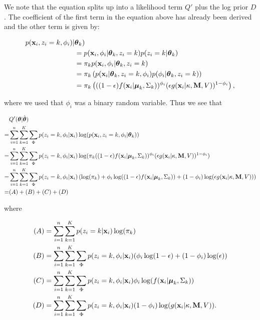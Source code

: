 \documentclass[12pt,english]{article}\usepackage[]{graphicx}\usepackage[]{color}
\begin{document}
We note that the equation splits up into a likelihood term $Q'$ plus
the log prior $D$. The coefficient of the first term in the equation
above has already been derived and the other term is given by:

\begin{equation}
\begin{split}
p({\bf x}_i, z_i = k , \phi_i)|&\boldsymbol{\theta}_k) \\
&=  p({\bf x}_i,\phi_i|\boldsymbol{\theta}_k,z_i=k)p(z_i=k|\boldsymbol{\theta}_k) \\
 & = \pi_k p({\bf x}_i,\phi_i|\boldsymbol{\theta}_k,z_i=k)\\
 & =\pi_k \left(p({\bf x}_i|\boldsymbol{\theta}_k,z_i=k, \phi_i)p(\phi_i|\boldsymbol{\theta}_k,z_i=k)\right)\\
 & = \pi_k \left(((1 - \epsilon)f({\bf x}_i|\boldsymbol{\mu}_k, \Sigma_k))^{\phi_i}(\epsilon g({\bf x}_i|\kappa, {\bf M}, V))^{1-\phi_i}\right),
\end{split}
\end{equation}

where we used that $\phi_i$ was a binary random variable. Thus we see that

\begin{equation}
\begin{split}
&Q'(\boldsymbol{\theta}| \hat{\boldsymbol{\theta}}) \\
 = & \sum_{i=1}^{n} \sum_{k=1}^{K}\sum_{\Phi}p(z_i = k, \phi_i|{\bf x}_i) \log(p({\bf x}_i, z_i = k , \phi_i|\boldsymbol{\theta}_k)) \\
= & \sum_{i=1}^{n} \sum_{k=1}^{K}\sum_{\Phi}p(z_i = k, \phi_i|{\bf x}_i) \log(\pi_k ((1 - \epsilon)f({\bf x}_i|\boldsymbol{\mu}_k, \Sigma_k))^{\phi_i}(\epsilon g({\bf x}_i|\kappa, {\bf M}, V))^{1-\phi_i})  \\
= & \sum_{i=1}^{n} \sum_{k=1}^{K}\sum_{\Phi}p(z_i = k, \phi_i|{\bf x}_i)\left( \log(\pi_k)  + \phi_i\log((1 - \epsilon)f({\bf x}_i|\boldsymbol{\mu}_k, \Sigma_k)) + (1-\phi_i)\log(\epsilon g({\bf x}_i|\kappa, {\bf M}, V))\right)  \\
= & (A) + (B) + (C) + (D)
\end{split}
\end{equation}

where

\begin{equation}
\begin{split}
(A) &= \sum_{i=1}^{n} \sum_{k=1}^{K}p(z_i = k|{\bf x}_i)\log(\pi_k) \\
(B) & = \sum_{i=1}^{n} \sum_{k=1}^{K}\sum_{\Phi}p(z_i = k, \phi_i|{\bf x}_i)(\phi_i\log(1 - \epsilon) + (1-\phi_i)\log(\epsilon))\\
(C) & = \sum_{i=1}^{n} \sum_{k=1}^{K}\sum_{\Phi}p(z_i = k, \phi_i|{\bf x}_i)\phi_i \log (f({\bf x}_i|\boldsymbol{\mu}_k, \Sigma_k))\\
(D)& = \sum_{i=1}^{n} \sum_{k=1}^{K}\sum_{\Phi}p(z_i = k, \phi_i|{\bf x}_i)(1-\phi_i)\log( g({\bf x}_i|\kappa, {\bf M}, V)).\\
\end{split}
\end{equation}
\end{document}
